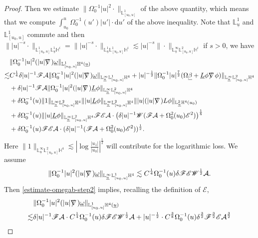 \documentclass[11pt,reqno]{amsart}
\theoremstyle{definition}
\numberwithin{equation}{section}
\newcommand{\D}{\mathrm{d}}
\renewcommand{\L}{\mathbb{L}}
\renewcommand{\H}{\mathbb{H}}
\def\betab{\underline{\beta}}
\def\Lb{\underline{L}}
\def\omegab{\underline{\omega}}
\def\ub{\underline{u}}
\def\nablas{\mbox{$\nabla \mkern -13mu /$ }}
\begin{document}
\begin{proof}
Then we estimate $\|\Omega_0^{-1}|u|^2\cdot\|_{\L^1_{[u_0,u]}}$ of the above quantity, which means that we compute $\int_{u_0}^u\Omega_0^{-1}(u')|u'|\cdot\D u'$ of the above inequality. Note that $\L^1_{\ub}$ and $\L^1_{[u_0,u]}$ commute and then $\||u|^{-s}\cdot\|_{\L^1_{[u_0,u]}\L^1_{\ub}\H^i}=\||u|^{-s}\cdot\|_{\L^1_{\ub}\L^1_{[u_0,u]}\H^i}\lesssim|u|^{-s}\|\cdot\|_{\L^\infty_{\ub}\L^2_{[u_0,u]}\H^i}$ if $s>0$, we have
\begin{equation}\label{estimate-omegab-step2}
\begin{split}
&\|\Omega_0^{-1}|u|^2(|u|\nablas)\omegab\|_{\L^1_{[u_0,u]}\H^4(\ub)}\\\lesssim&C^{\frac{1}{4}}\delta|u|^{-1}\mathscr{F}\mathcal{A}\|\Omega_0^{-1}|u|^2(|u|\nablas)\omegab\|_{\L^\infty_{\ub}\L^1_{[u_0,u]}\H^4}+|u|^{-\frac{1}{2}}\|\Omega_0^{-1}|u|^{\frac{7}{2}}(\Omega\betab+\Lb\phi\nablas\phi)\|_{\L^\infty_{\ub}\L^2_{[u_0,u]}\H^4}\\
&+\delta|u|^{-1}\mathscr{F}\mathcal{A}\|\Omega_0^{-1}|u|^2(|u|\nablas)\Lb\phi\|_{\L^\infty_{\ub}\L^2_{[u_0,u]}\H^4}\\
&+\delta\Omega_0^{-1}(u)\|1\|_{\L^\infty_{\ub}\L^2_{[u_0,u]}\H^4}\||u|\Lb\phi\|_{\L^\infty_{\ub}\L^2_{[u_0,u]}\H^4}\||u|(|u|\nablas)L\phi\|_{\L^2_{\ub}\H^4(u_0)}\\
&+\delta\Omega_0^{-1}(u)\||u|\Lb\phi\|_{\L^\infty_{\ub}\L^2_{[u_0,u]}\H^4}\mathscr{F}\mathscr{E}\mathcal{A}\cdot\left(\delta|u|^{-1}\mathscr{W}(\mathscr{F}\mathcal{A}+\Omega_0^2(u_0)\mathscr{E}^2)\right)^{\frac{1}{8}}\\
&+\delta\Omega_0^{-1}(u)\mathscr{F}\mathscr{E}\mathcal{A}\cdot(\delta|u|^{-1}(\mathscr{F}\mathcal{A}+\Omega_0^2(u_0)\mathscr{E}^2))^{\frac{1}{2}}.
\end{split}
\end{equation}
Here $\|1\|_{\L^\infty_{\ub}\L^2_{[u_0,u]}\H^4}\lesssim\left|\log\frac{|u_1|}{|u_0|}\right|^{\frac{1}{2}}$ will contribute for the logarithmic loss. We assume
\begin{equation}\label{bootstrap-omegab}
\|\Omega_0^{-1}|u|^2(|u|\nablas)\omegab\|_{\L^\infty_{\ub}\L^1_{[u_0,u]}\H^4}\lesssim C^{\frac{1}{4}}\Omega_0^{-1}(u)\delta\mathscr{F}\mathscr{E}\mathscr{W}^{\frac{1}{2}}\mathcal{A}.
\end{equation}
Then \eqref{estimate-omegab-step2} implies, recalling the definition of $\mathscr{E}$,
\begin{equation}\label{estimate-omegab-step3}
\begin{split}
&\|\Omega_0^{-1}|u|^2(|u|\nablas)\omegab\|_{\L^1_{[u_0,u]}\H^4(\ub)}\\\lesssim&\delta|u|^{-1}\mathscr{F}\mathcal{A}\cdot C^{\frac{1}{4}}\Omega_0^{-1}(u)\delta\mathscr{F}\mathscr{E}\mathscr{W}^{\frac{1}{2}}\mathcal{A}+|u|^{-\frac{1}{2}}\cdot C^{\frac{3}{8}}\Omega_0^{-1}(u)\delta^{\frac{3}{2}}\mathscr{F}^{\frac{3}{2}}\mathscr{E}\mathcal{A}^{\frac{3}{2}}\\

\end{split}
\end{equation}
\end{proof}
\end{document}
